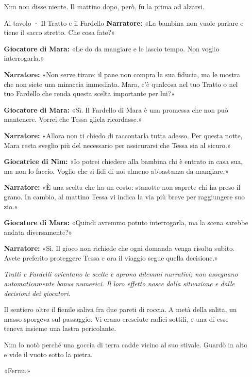 \documentclass[10pt,a4paper]{article}
\begin{document}
Nim non disse niente. Il mattino dopo, però, fu la prima ad alzarsi.
\begin{rpgexample}{Al tavolo · Il Tratto e il Fardello}
\textbf{Narratore:} «La bambina non vuole parlare e tiene il sacco stretto. Che cosa fate?»

\textbf{Giocatore di Mara:} «Le do da mangiare e le lascio tempo. Non voglio interrogarla.»

\textbf{Narratore:} «Non serve tirare: il pane non compra la sua fiducia, ma le mostra che non siete una minaccia immediata. Mara, c'è qualcosa nel tuo Tratto o nel tuo Fardello che renda questa scelta importante per lui?»

\textbf{Giocatore di Mara:} «Sì. Il Fardello di Mara è una promessa che non può mantenere. Vorrei che Tessa gliela ricordasse.»

\textbf{Narratore:} «Allora non ti chiedo di raccontarla tutta adesso. Per questa notte, Mara resta sveglio più del necessario per assicurarsi che Tessa sia al sicuro.»

\textbf{Giocatrice di Nim:} «Io potrei chiedere alla bambina chi è entrato in casa sua, ma non lo faccio. Voglio che si fidi di noi almeno abbastanza da mangiare.»

\textbf{Narratore:} «È una scelta che ha un costo: stanotte non saprete chi ha preso il grano. In cambio, al mattino Tessa vi indica la via più breve per raggiungere suo zio.»

\textbf{Giocatore di Mara:} «Quindi avremmo potuto interrogarla, ma la scena sarebbe andata diversamente?»

\textbf{Narratore:} «Sì. Il gioco non richiede che ogni domanda venga risolta subito. Avete preferito proteggere Tessa e ora il viaggio segue quella decisione.»

\emph{Tratti e Fardelli orientano le scelte e aprono dilemmi narrativi; non assegnano automaticamente bonus numerici. Il loro effetto nasce dalla situazione e dalle decisioni dei giocatori.}

\end{rpgexample}
Il sentiero oltre il fienile saliva fra due pareti di roccia. A metà della salita, un masso sporgeva sul passaggio. Vi erano cresciute radici sottili, e una di esse teneva insieme una lastra pericolante.

Nim lo notò perché una goccia di terra cadde vicino al suo stivale. Guardò in alto e vide il vuoto sotto la pietra.

«Fermi.»
\end{document}
